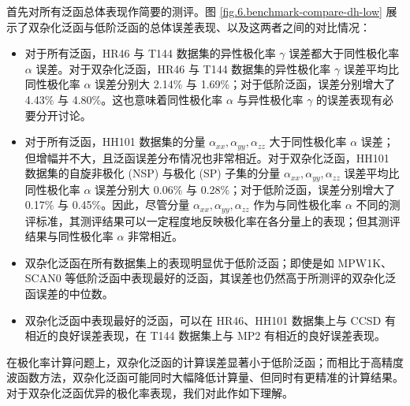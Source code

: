 首先对所有泛函总体表现作简要的测评。图 \ref{fig.6.benchmark-compare-dh-low} 展示了双杂化泛函与低阶泛函的总体误差表现、以及这两者之间的对比情况：
\begin{itemize}[nosep]
    \item 对于所有泛函，HR46 与 T144 数据集的异性极化率 $\gamma$ 误差都大于同性极化率 $\alpha$ 误差。对于双杂化泛函，HR46 与 T144 数据集的异性极化率 $\gamma$ 误差平均比同性极化率 $\alpha$ 误差分别大 2.14\% 与 1.69\%；对于低阶泛函，误差分别增大了 4.43\% 与 4.80\%。这也意味着同性极化率 $\alpha$ 与异性极化率 $\gamma$ 的误差表现有必要分开讨论。
    \item 对于所有泛函，HH101 数据集的分量 $\alpha_{xx}, \alpha_{yy}, \alpha_{zz}$ 大于同性极化率 $\alpha$ 误差；但增幅并不大，且泛函误差分布情况也非常相近。对于双杂化泛函，HH101 数据集的自旋非极化 (NSP) 与极化 (SP) 子集的分量 $\alpha_{xx}, \alpha_{yy}, \alpha_{zz}$ 误差平均比同性极化率 $\alpha$ 误差分别大 0.06\% 与 0.28\%；对于低阶泛函，误差分别增大了 0.17\% 与 0.45\%。因此，尽管分量 $\alpha_{xx}, \alpha_{yy}, \alpha_{zz}$ 作为与同性极化率 $\alpha$ 不同的测评标准，其测评结果可以一定程度地反映极化率在各分量上的表现；但其测评结果与同性极化率 $\alpha$ 非常相近。
    \item 双杂化泛函在所有数据集上的表现明显优于低阶泛函；即使是如 MPW1K、SCAN0 等低阶泛函中表现最好的泛函，其误差也仍然高于所测评的双杂化泛函误差的中位数。
    \item 双杂化泛函中表现最好的泛函，可以在 HR46、HH101 数据集上与 CCSD 有相近的良好误差表现，在 T144 数据集上与 MP2 有相近的良好误差表现。
\end{itemize}

在极化率计算问题上，双杂化泛函的计算误差显著小于低阶泛函；而相比于高精度波函数方法，双杂化泛函可能同时大幅降低计算量、但同时有更精准的计算结果。对于双杂化泛函优异的极化率表现，我们对此作如下理解。

